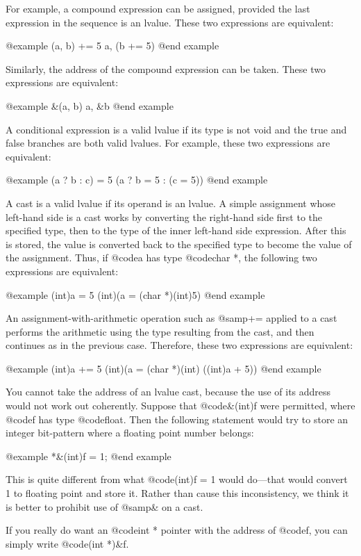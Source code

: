 {For example, a compound expression can be assigned, provided the last
expression in the sequence is an lvalue.  These two expressions are
equivalent:

@example
(a, b) += 5
a, (b += 5)
@end example

Similarly, the address of the compound expression can be taken.  These two
expressions are equivalent:

@example
&(a, b)
a, &b
@end example

A conditional expression is a valid lvalue if its type is not void and the
true and false branches are both valid lvalues.  For example, these two
expressions are equivalent:

@example
(a ? b : c) = 5
(a ? b = 5 : (c = 5))
@end example

A cast is a valid lvalue if its operand is an lvalue.  A simple
assignment whose left-hand side is a cast works by converting the
right-hand side first to the specified type, then to the type of the
inner left-hand side expression.  After this is stored, the value is
converted back to the specified type to become the value of the
assignment.  Thus, if @code{a} has type @code{char *}, the following two
expressions are equivalent:

@example
(int)a = 5
(int)(a = (char *)(int)5)
@end example

An assignment-with-arithmetic operation such as @samp{+=} applied to a cast
performs the arithmetic using the type resulting from the cast, and then
continues as in the previous case.  Therefore, these two expressions are
equivalent:

@example
(int)a += 5
(int)(a = (char *)(int) ((int)a + 5))
@end example

You cannot take the address of an lvalue cast, because the use of its
address would not work out coherently.  Suppose that @code{&(int)f} were
permitted, where @code{f} has type @code{float}.  Then the following
statement would try to store an integer bit-pattern where a floating
point number belongs:

@example
*&(int)f = 1;
@end example

This is quite different from what @code{(int)f = 1} would do---that
would convert 1 to floating point and store it.  Rather than cause this
inconsistency, we think it is better to prohibit use of @samp{&} on a cast.

If you really do want an @code{int *} pointer with the address of
@code{f}, you can simply write @code{(int *)&f}.

}
